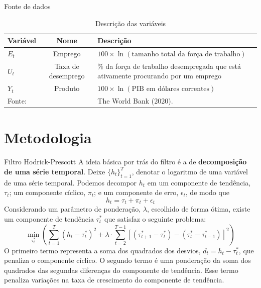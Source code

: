 \documentclass[11pt]{beamer}
\begin{document}
\begin{frame}{Fonte de dados}

\begin{table}[H]
\centering
\scriptsize
\caption*{Descrição das  variáveis}
\label{tab:dados}
\begin{tabularx}{\textwidth}{lcX} \\
Variável & Nome & Descrição \\ \midrule
$E_t$ & Emprego & $100 \times \ln(\text{tamanho total da força de trabalho})$ \\ \midrule
$U_t$ & Taxa de desemprego & $\%$ da força de trabalho desempregada que está ativamente procurando por um emprego \\ \midrule 
$Y_t$ & Produto & $100 \times \ln(\text{PIB em dólares correntes})$ \\ \bottomrule 
Fonte: & & The World Bank (2020).
\end{tabularx}
\end{table}

\end{frame}

\section{Metodologia}

\begin{frame}{Filtro Hodrick-Prescott}
\small 
A ideia básica por trás do filtro é a de \textbf{decomposição de uma série temporal}. Deixe $\{h_t\}_{t=1}^{T}$, denotar o logaritmo de uma variável de uma série temporal. Podemos decompor $h_t$ em um componente de tendência, $\tau_t$; um componente cíclico, $\pi_t$; e um componente de erro, $\epsilon_t$, de modo que 
\begin{equation}
h_t = \tau_t + \pi_t + \epsilon_t
\end{equation}
Considerando um parâmetro de ponderação, $\lambda$, escolhido de forma ótima, existe um componente de tendência $\tau_t^*$ que satisfaz o seguinte problema:
\begin{equation}
\underset{\tau_t^*}{\operatorname{min}} \left( \sum_{t=1}^T (h_t-\tau_t^*)^2 + \lambda \cdot \sum_{t=2}^{T-1} [(\tau_{t+1}^*-\tau_t^*) - (\tau_t^* - \tau_{t-1}^*)]^2 \right)
\end{equation}
O primeiro termo representa a soma dos quadrados dos desvios, $d_t = h_t - \tau_t^*$, que penaliza o componente cíclico. O segundo termo é uma ponderação da soma dos quadrados das segundas diferenças do componente de tendência. Esse termo penaliza variações na taxa de crescimento do componente de tendência.

\end{frame}
\end{document}
